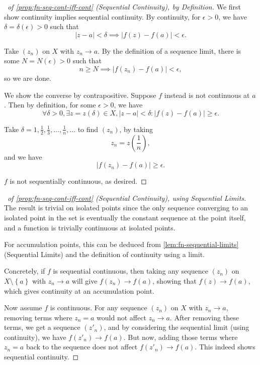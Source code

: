 \documentclass[11pt]{article}
\numberwithin{equation}{section}
\theoremstyle{definition}
\theoremstyle{remark}
\newcommand{\pqty}[1]{\left(#1\right)}
\newcommand{\Bqty}[1]{\left\{#1\right\}}
\newcommand{\abs}[1]{\left|#1\right|}
\begin{document}
\begin{proof}[\proofname\ of \autoref{prop:fn-seq-cont-iff-cont} (Sequential Continuity), by Definition]
    We first show continuity implies sequential continuity. By continuity, for \(\epsilon > 0\), we have \(\delta = \delta\pqty{\epsilon} > 0\) such that
    \[
        \abs{z - a} < \delta \implies \abs{f\pqty{z} - f\pqty{a}} < \epsilon.
    \]

    Take \(\pqty{z_n}\) on \(X\) with \(z_n \to a\). By the definition of a sequence limit, there is some \(N = N\pqty{\epsilon} > 0\) such that
    \[
        n \geq N \implies \abs{f\pqty{z_n} - f\pqty{a}} < \epsilon,
    \]
    so we are done.

    We show the converse by contrapositive. Suppose \(f\) instead is not continuous at \(a\). Then by definition, for some \(\epsilon > 0\), we have
    \[
        \forall \delta > 0, \exists z = z\pqty{\delta} \in X, \abs{z - a} < \delta: \abs{f\pqty{z} - f\pqty{a}} \geq \epsilon.
    \]

    Take \(\delta = 1, \frac{1}{2}, \frac{1}{3}, \ldots, \frac{1}{n}, \ldots\) to find \(\pqty{z_n}\), by taking
    \[
        z_n = z \pqty{\frac{1}{n}},
    \]
    and we have
    \[
        \abs{f\pqty{z_n} - f\pqty{a}} \geq \epsilon.
    \]

    \(f\) is not sequentially continuous, as desired.
\end{proof}

\begin{proof}[\proofname\ of \autoref{prop:fn-seq-cont-iff-cont} (Sequential Continuity), using Sequential Limits]
    The result is trivial on isolated points since the only sequence converging to an isolated point in the set is eventually the constant sequence at the point itself, and a function is trivially continuous at isolated points.

    For accumulation points, this can be deduced from \autoref{lem:fn-sequential-limits} (Sequential Limits) and the definition of continuity using a limit. 
    
    Concretely, if \(f\) is sequential continuous, then taking any sequence \(\pqty{z_n}\) on \(X \setminus \Bqty{a}\) with \(z_n \to a\) will give \(f\pqty{z_n} \to f\pqty{a}\), showing that \(f\pqty{z} \to f\pqty{a}\), which gives continuity at an accumulation point.

    Now assume \(f\) is continuous. For any sequence \(\pqty{z_n}\) on \(X\) with \(z_n \to a\), removing terms where \(z_n = a\) would not affect \(z_n \to a\). After removing these terms, we get a sequence \(\pqty{z'_n}\), and by considering the sequential limit (using continuity), we have \(f\pqty{z'_n} \to f\pqty{a}\). But now, adding those terms where \(z_n = a\) back to the sequence does not affect \(f\pqty{z'_n} \to f\pqty{a}\). This indeed shows sequential continuity.
\end{proof}
\end{document}
